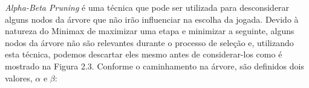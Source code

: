 






\textit{Alpha-Beta Pruning} é uma técnica que pode ser utilizada para desconsiderar alguns nodos da árvore que não irão influenciar na escolha da jogada. Devido à natureza do Minimax de maximizar uma etapa e minimizar a seguinte, alguns nodos da árvore não são relevantes durante o processo de seleção e, utilizando esta técnica, podemos descartar eles mesmo antes de considerar-los como é mostrado na Figura 2.3. Conforme o caminhamento na árvore, são definidos dois valores, $\alpha$ e $\beta$:

